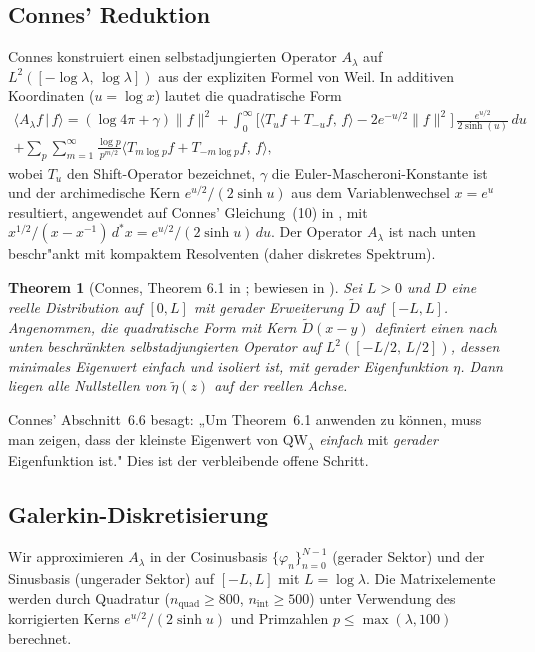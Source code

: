 \documentclass[12pt,a4paper]{article}
\newtheorem{theorem}{Theorem}[section]
\theoremstyle{definition}
\theoremstyle{remark}
\begin{document}
\subsection{Connes' Reduktion}

Connes konstruiert einen selbstadjungierten Operator $A_\lambda$ auf $L^2([-\log\lambda,\,\log\lambda])$ aus der expliziten Formel von Weil. In additiven Koordinaten ($u = \log x$) lautet die quadratische Form
\begin{multline*}
  \langle A_\lambda f \,|\, f \rangle = (\log 4\pi + \gamma)\|f\|^2
  + \int_0^\infty \Big[\langle T_u f + T_{-u} f,\, f \rangle - 2e^{-u/2}\|f\|^2\Big]\,\frac{e^{u/2}}{2\sinh(u)}\,du \\
  + \sum_p \sum_{m=1}^\infty \frac{\log p}{p^{m/2}} \langle T_{m\log p} f + T_{-m\log p} f,\, f \rangle,
\end{multline*}
wobei $T_u$ den Shift-Operator bezeichnet, $\gamma$ die Euler-Mascheroni-Konstante ist und der archimedische Kern $e^{u/2}/(2\sinh u)$ aus dem Variablenwechsel $x = e^u$ resultiert, angewendet auf Connes' Gleichung~(10) in \cite{Connes2026}, mit $x^{1/2}/(x-x^{-1})\,d^*\!x = e^{u/2}/(2\sinh u)\,du$. Der Operator $A_\lambda$ ist nach unten beschr"ankt mit kompaktem Resolventen (daher diskretes Spektrum).

\begin{theorem}[Connes, Theorem 6.1 in \cite{Connes2026}; bewiesen in \cite{ConnesvS2025}]
Sei $L > 0$ und $D$ eine reelle Distribution auf $[0,L]$ mit gerader Erweiterung $\tilde{D}$ auf $[-L,L]$. Angenommen, die quadratische Form mit Kern $\tilde{D}(x-y)$ definiert einen nach unten beschränkten selbstadjungierten Operator auf $L^2([-L/2,\,L/2])$, dessen minimales Eigenwert einfach und isoliert ist, mit gerader Eigenfunktion $\eta$. Dann liegen alle Nullstellen von $\tilde{\eta}(z)$ auf der reellen Achse.
\end{theorem}

\noindent Connes' Abschnitt~6.6 besagt: „Um Theorem~6.1 anwenden zu können, muss man zeigen, dass der kleinste Eigenwert von $\mathrm{QW}_\lambda$ \emph{einfach} mit \emph{gerader} Eigenfunktion ist." Dies ist der verbleibende offene Schritt.

\subsection{Galerkin-Diskretisierung}

Wir approximieren $A_\lambda$ in der Cosinusbasis $\{\varphi_n\}_{n=0}^{N-1}$ (gerader Sektor) und der Sinusbasis (ungerader Sektor) auf $[-L,L]$ mit $L = \log\lambda$. Die Matrixelemente werden durch Quadratur ($n_{\mathrm{quad}} \geq 800$, $n_{\mathrm{int}} \geq 500$) unter Verwendung des korrigierten Kerns $e^{u/2}/(2\sinh u)$ und Primzahlen $p \leq \max(\lambda, 100)$ berechnet.
\end{document}
